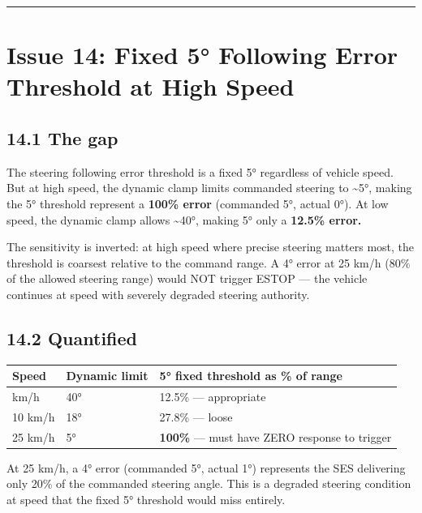 \documentclass[12pt,a4paper,oneside]{report}
\begin{document}
\begin{center}\rule{0.5\linewidth}{0.5pt}\end{center}

\section{Issue 14: Fixed 5° Following Error Threshold at High
Speed}\label{issue-14-fixed-5-following-error-threshold-at-high-speed}

\subsection{14.1 The gap}\label{the-gap-7}

The steering following error threshold is a fixed 5° regardless of vehicle
speed. But at high speed, the dynamic clamp limits commanded steering to
\textasciitilde5°, making the 5° threshold represent a \textbf{100\% error}
(commanded 5°, actual 0°). At low speed, the dynamic clamp allows
\textasciitilde40°, making 5° only a \textbf{12.5\% error.}

The sensitivity is inverted: at high speed where precise steering matters most,
the threshold is coarsest relative to the command range. A 4° error at 25 km/h
(80\% of the allowed steering range) would NOT trigger ESTOP --- the vehicle
continues at speed with severely degraded steering authority.

\subsection{14.2 Quantified}\label{quantified}

\begin{longtable}[]{@{}lll@{}}
\toprule\noalign{}
Speed & Dynamic limit & 5° fixed threshold as \% of range \\
\midrule\noalign{}
\endhead
\bottomrule\noalign{}
\endlastfoot
2 km/h & 40° & 12.5\% --- appropriate \\
10 km/h & 18° & 27.8\% --- loose \\
25 km/h & 5° & \textbf{100\%} --- must have ZERO response to trigger \\
\end{longtable}

At 25 km/h, a 4° error (commanded 5°, actual 1°) represents the SES delivering
only 20\% of the commanded steering angle. This is a degraded steering condition
at speed that the fixed 5° threshold would miss entirely.
\end{document}
